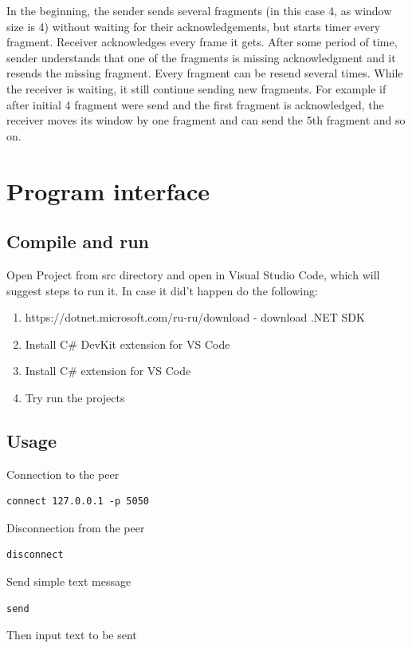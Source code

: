 \documentclass{article}
\begin{document}
In the beginning, the sender sends several fragments (in this case 4, as window size is 4) without waiting for their acknowledgements, but starts timer every fragment.  Receiver acknowledges every frame it gets. After some period of time, sender understands that one of the fragments is missing acknowledgment and it resends the missing fragment. Every fragment can be resend several times. While the receiver is waiting, it still continue sending new fragments. For example if after initial 4 fragment were send and the first fragment is acknowledged,  the receiver moves its window by one fragment and can send the 5th fragment and so on. 

\pagebreak

\section{Program interface}
\subsection{Compile and run}

Open Project from src directory and open in Visual Studio Code, which will suggest steps to run it. In case it did't happen do the following:
\begin{enumerate}
\item https://dotnet.microsoft.com/ru-ru/download - download .NET SDK
\item Install C\# DevKit extension for VS Code
\item Install C\# extension for VS Code
\item Try run the projects
\end{enumerate}

\subsection{Usage}
Connection to the peer
\begin{lstlisting}
connect 127.0.0.1 -p 5050
\end{lstlisting}
Disconnection from the peer
\begin{lstlisting}
disconnect
\end{lstlisting}
Send simple text message
\begin{lstlisting}
send
\end{lstlisting}
Then input text to be sent
\end{document}
